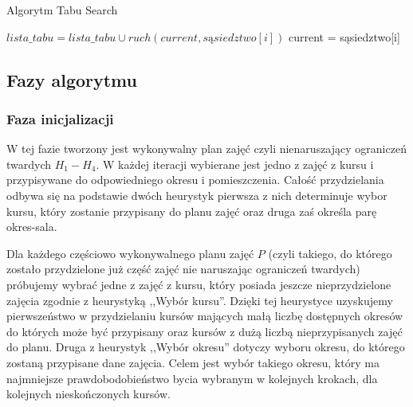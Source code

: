 \documentclass[11pt]{report}
\begin{document}
\begin{algorithm}[H]
    \caption{Algorytm Tabu Search}
    \begin{algorithmic}
    	\STATE $lista\_tabu = lista\_tabu \cup ruch(current, sąsiedztwo[i])$
    	\STATE current = sąsiedztwo[i]
    	\ENDIF
    \ENDFOR
    \ENDWHILE
    \end{algorithmic}
    \end{algorithm}

\subsection{Fazy algorytmu}
\subsubsection{Faza inicjalizacji}
\par W tej fazie tworzony jest wykonywalny plan zajęć czyli nienaruszający ograniczeń twardych ${H_{1} - H_{4}}$. W każdej iteracji wybierane jest jedno z zajęć z kursu i przypisywane do odpowiedniego okresu i pomieszczenia. Całość przydzielania odbywa się na podstawie dwóch heurystyk pierwsza z nich determinuje wybor kursu, który zostanie przypisany do planu zajęć oraz druga zaś określa parę okres-sala.
\par Dla każdego częściowo wykonywalnego planu zajęć ${P}$ (czyli takiego, do którego zostało przydzielone już część zajęć nie naruszając ograniczeń twardych) próbujemy wybrać jedne z zajęć z kursu, który posiada jeszcze nieprzydzielone zajęcia zgodnie z heurystyką ,,Wybór kursu''. Dzięki tej heurystyce uzyskujemy pierwszeństwo w przydzielaniu kursów mających małą liczbę dostępnych okresów do których może być przypisany oraz kursów z dużą liczbą nieprzypisanych zajęć do planu. Druga z heurystyk ,,Wybór okresu'' dotyczy wyboru okresu, do którego zostaną przypisane dane zajęcia. Celem jest wybór takiego okresu, który ma najmniejsze prawdobodobieństwo bycia wybranym w kolejnych krokach, dla kolejnych nieskończonych kursów.
\end{document}
